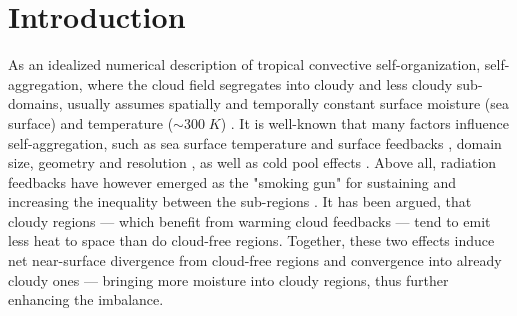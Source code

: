 \documentclass[draft,linenumbers]{agujournal2019}
\begin{document}
%
%
%
%


\section{Introduction}\label{sec:intro}
As an idealized numerical description of tropical convective self-organization, self-aggregation, where the cloud field segregates into cloudy and less cloudy sub-domains, usually assumes spatially and temporally constant surface moisture (sea surface) and temperature ($\sim 300\;K$) \cite{muller2012detailed}.
It is well-known that many factors influence self-aggregation, such as sea surface temperature and surface feedbacks \cite{hohenegger2016coupled}, domain size, geometry and resolution \cite{muller2015favors}, as well as cold pool effects \cite{jeevanjee2013convective,haerter2019convective}.
Above all, radiation feedbacks have however emerged as the "smoking gun" for sustaining and increasing the inequality between the sub-regions \cite{bretherton2005energy}.
It has been argued, that cloudy regions --- which benefit from warming cloud feedbacks --- tend to emit less heat to space than do cloud-free regions.
Together, these two effects induce net near-surface divergence from cloud-free regions and convergence into already cloudy ones --- bringing more moisture into cloudy regions, thus further enhancing the imbalance.
\end{document}

